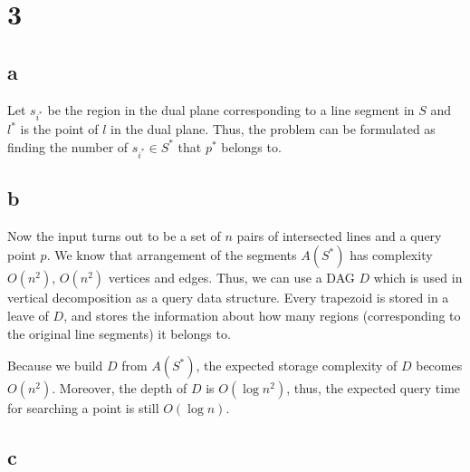 \section*{3}
\subsection*{a}
Let $s_{i^*}$ be the region in the dual plane corresponding to a line segment in $S$ and $l^*$ is the point
of $l$ in the dual plane.  Thus, the problem can be formulated as finding the number
of $s_{i^*} \in S^*$ that $p^*$ belongs to.

\subsection*{b}
Now the input turns out to be a set of $n$ pairs of intersected lines and a query point $p$.  We know that arrangement of the segments $A(S^*)$ has complexity $O(n^2)$,
$O(n^2)$ vertices and edges. Thus, we can use a DAG $D$ which is used in vertical decomposition as a query data structure.
Every trapezoid is stored in a leave of $D$, and stores the information about how many regions (corresponding to the original line segments) it belongs to.

Because we build $D$ from $A(S^*)$, the expected storage complexity of $D$ becomes $O(n^2)$.
Moreover, the depth of $D$ is $O(\log n^2)$, thus, the expected query time for searching a point is still $O(\log n)$.

\subsection*{c}

